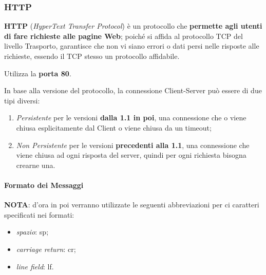\documentclass[a4paper]{article}
\begin{document}
		\newpage
	
		\subsubsection{HTTP}
		
			\textbf{HTTP} (\emph{HyperText Transfer Protocol}) è un protocollo che \textbf{permette agli utenti di fare richieste alle pagine Web}; poiché si affida al protocollo TCP del livello Trasporto, garantisce che non vi siano errori o dati persi nelle risposte alle richieste, essendo il TCP stesso un protocollo affidabile.
			
			Utilizza la \textbf{porta 80}.\newline
			
			In base alla versione del protocollo, la connessione Client-Server può essere di due tipi diversi:
			\begin{enumerate}
				\item \emph{Persistente} per le versioni \textbf{dalla 1.1 in poi}, una connessione che o viene chiusa esplicitamente dal Client o viene chiusa da un timeout;
				\item \emph{Non Persistente} per le versioni \textbf{precedenti alla 1.1}, una connessione che viene chiusa ad ogni risposta del server, quindi per ogni richiesta bisogna crearne una.
			\end{enumerate}
	
			\paragraph{Formato dei Messaggi}
				\textbf{NOTA}: d'ora in poi verranno utilizzate le seguenti abbreviazioni per ci caratteri specificati nei formati:
				\begin{itemize}
					\item \emph{spazio}: sp;
					\item \emph{carriage return}: cr;
					\item \emph{line field}: lf.\\
				\end{itemize}
				
\end{document}
